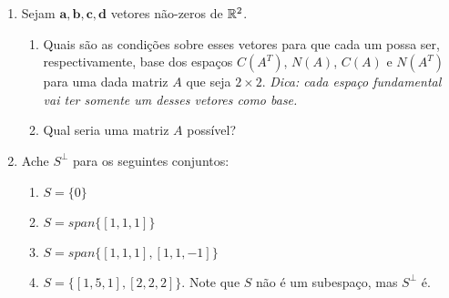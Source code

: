 \documentclass[leqno]{article}
\numberwithin{equation}{section}
\begin{document}
\begin{enumerate}
\item Sejam $\mathbf{a,b,c,d}$ vetores não-zeros de $\mathbb{R}^2$.

\begin{enumerate}

\item Quais são as condições sobre esses vetores para que cada um possa ser, respectivamente, base dos espaços $C(A^T)$, $N(A)$, $C(A)$ e $N(A^T)$ para uma dada matriz $A$ que seja $2 \times 2$. \textit{Dica: cada espaço fundamental vai ter somente um desses vetores como base.}

    \begin{sol}
        
    \end{sol}

\item Qual seria uma matriz $A$ possível?

    \begin{sol}
        
    \end{sol}

\end{enumerate}

\item Ache $S^{\perp}$ para os seguintes conjuntos:

\begin{enumerate}

\item $S = \{0\}$

    \begin{sol}
        
    \end{sol}

\item $S = span\{[1,1,1]\}$

    \begin{sol}
        
    \end{sol}

\item $S = span\{[1,1,1], [1,1,-1]\}$

    \begin{sol}
        
    \end{sol}

\item $S = \{[1,5,1], [2,2,2]\}$. Note que $S$ não é um subespaço, mas $S^\perp$ é.

    \begin{sol}
        

\end{sol}
\end{enumerate}
\end{enumerate}
\end{document}
